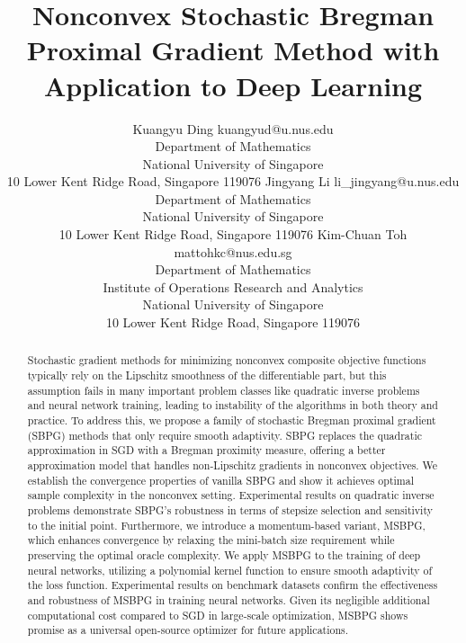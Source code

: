 \documentclass[twoside,11pt]{article}
\begin{document}
\title{Nonconvex Stochastic Bregman Proximal Gradient Method with Application to Deep Learning}

\author{\name Kuangyu Ding \email  kuangyud@u.nus.edu \\
       \addr Department of Mathematics\\
       National University of Singapore\\
       10 Lower Kent Ridge Road, Singapore 119076
       \AND
       \name Jingyang Li \email  li\_jingyang@u.nus.edu \\
       \addr Department of Mathematics\\
       National University of Singapore\\
       10 Lower Kent Ridge Road, Singapore 119076
       \AND
       \name Kim-Chuan Toh \email  mattohkc@nus.edu.sg \\
       \addr Department of Mathematics \\ Institute of Operations Research and Analytics\\
       National University of Singapore\\
       10 Lower Kent Ridge Road, Singapore 119076}


\editor{}


\maketitle

\begin{abstract}%
Stochastic gradient methods for minimizing nonconvex composite objective functions typically rely on the Lipschitz smoothness of the differentiable part, but this assumption fails in many important problem classes like quadratic inverse problems and neural network training, leading to instability of the algorithms in both theory and practice. To address this, we propose a family of stochastic Bregman proximal gradient (SBPG) methods that only require smooth adaptivity. SBPG replaces the quadratic approximation in SGD with a Bregman proximity measure, offering a better approximation model that handles non-Lipschitz gradients in nonconvex objectives. We establish the convergence properties of vanilla SBPG and show it achieves optimal sample complexity in the nonconvex setting. Experimental results on quadratic inverse problems demonstrate SBPG's robustness in terms of stepsize selection and sensitivity to the initial point. Furthermore, we introduce a momentum-based variant, MSBPG, which enhances convergence by relaxing the mini-batch size requirement while preserving the optimal oracle complexity. We apply MSBPG to the training of deep neural networks, utilizing a polynomial kernel function to ensure smooth adaptivity of the loss function. Experimental results on benchmark datasets confirm the effectiveness and robustness of MSBPG in training neural networks. Given its negligible additional computational cost compared to SGD in large-scale optimization, MSBPG shows promise as a universal open-source optimizer for future applications.

\end{abstract}
\end{document}
